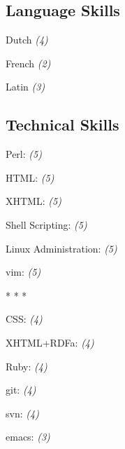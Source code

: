 \documentclass[]{article}
\begin{document}
\subsection*{Language Skills}
Dutch \emph{(4)}
  \label{dutch4}

       

French \emph{(2)}
  \label{french2}

       

Latin \emph{(3)}
  \label{latin3}

       
	
\subsection*{Technical Skills}	
 Perl: \emph{(5)}
  \label{perl5}

       

 HTML: \emph{(5)}
  \label{html5}

       

 XHTML: \emph{(5)}
  \label{xhtml5}

       

 Shell Scripting: \emph{(5)}
  \label{shellscripting5}

       

 Linux Administration: \emph{(5)}
  \label{linuxadministration5}

       

 vim: \emph{(5)}
  \label{vim5}

       

 \begin{center}* * * \end{center}
 CSS: \emph{(4)}
  \label{css4}

       

 XHTML+RDFa: \emph{(4)}
  \label{xhtml+rdfa4}

       

 Ruby: \emph{(4)}
  \label{ruby4}

       

 git: \emph{(4)}
  \label{git4}

       

 svn: \emph{(4)}
  \label{svn4}

       

 emacs: \emph{(3)}
  \label{emacs3}
\end{document}
